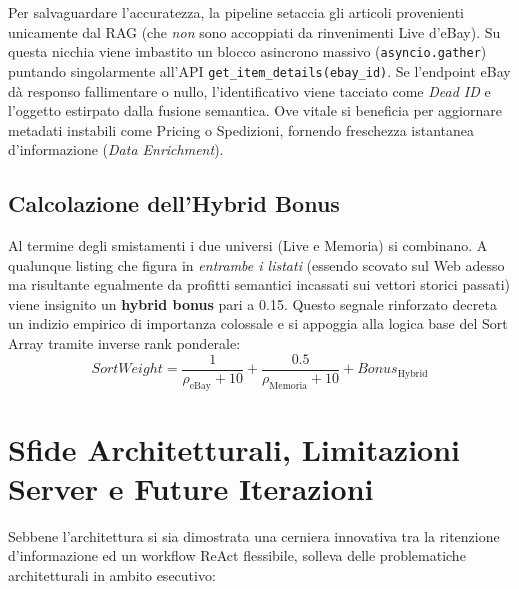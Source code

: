Per salvaguardare l'accuratezza, la pipeline setaccia gli articoli provenienti unicamente dal RAG (che \textit{non} sono accoppiati da rinvenimenti Live d'eBay). Su questa nicchia viene imbastito un blocco asincrono massivo (\texttt{asyncio.gather}) puntando singolarmente all'API \texttt{get\_item\_details(ebay\_id)}. Se l'endpoint eBay dà responso fallimentare o nullo, l'identificativo viene tacciato come \textit{Dead ID} e l'oggetto estirpato dalla fusione semantica. Ove vitale si beneficia per aggiornare metadati instabili come Pricing o Spedizioni, fornendo freschezza istantanea d'informazione (\textit{Data Enrichment}).

\subsection{Calcolazione dell'Hybrid Bonus}
Al termine degli smistamenti i due universi (Live e Memoria) si combinano. A qualunque listing che figura in \textit{entrambe i listati} (essendo scovato sul Web adesso ma risultante egualmente da profitti semantici incassati sui vettori storici passati) viene insignito un \textbf{hybrid bonus} pari a 0.15. 
Questo segnale rinforzato decreta un indizio empirico di importanza colossale e si appoggia alla logica base del Sort Array tramite inverse rank ponderale:
\begin{equation}
    SortWeight = \frac{1}{\rho_{\text{eBay}} + 10} + \frac{0.5}{\rho_{\text{Memoria}} + 10} + Bonus_{\text{Hybrid}}
\end{equation}

\section{Sfide Architetturali, Limitazioni Server e Future Iterazioni}
\label{sec:rag-critics}

Sebbene l'architettura si sia dimostrata una cerniera innovativa tra la ritenzione d'informazione ed un workflow ReAct flessibile, solleva delle problematiche architetturali in ambito esecutivo:


